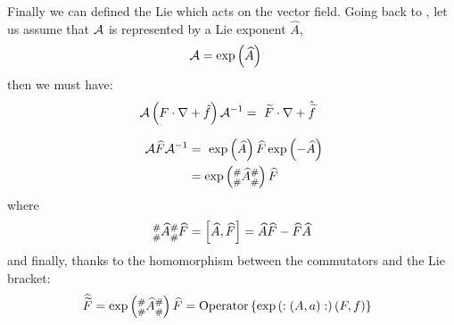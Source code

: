 \documentclass[english,12pt,article]{article} %
\begin{document}
{{{Finally we can defined the Lie which acts on the vector field. Going back to , let us assume that $\cal A$ is represented by a Lie exponent $\widehat{A}$,
%
\begin{align} {\cal A}&=\exp\left({\widehat{A}}\right) \end{align}
%
 then we must have:
%
\begin{align} \ {\cal A}\left({F\cdot \nabla +\hat{f}}\right){{\cal A}}^{-1}&=\ \widetilde{F}\cdot \nabla +\hat{\widetilde{f}} \label{aacts}\end{align}

 

%
\begin{align} \ {\cal A}\widehat{F}{{\cal A}}^{-1}&=\ \exp\left({\widehat{A}}\right)\widehat{F}\exp\left({-\widehat{A}}\right) \nonumber \\
 &=\exp\left({\dragt\widehat{A}\dragt}\right)\widehat{F}\ \label{asimillie}\end{align}
where
%
\begin{align} \mbox{\scriptsize $\begin{matrix}\# \\ \# \end{matrix}$}\widehat{A}\mbox{\scriptsize $\begin{matrix}\# \\ \# \end{matrix}$}\widehat{F}=\left[{\widehat{A},\widehat{F}}\right]=
\widehat{A}\widehat{F}-\widehat{F}\widehat{A} \end{align}
and finally, thanks to the homomorphism between the commutators and the Lie bracket:
%
\begin{align} \  \widehat{\widetilde{F}}=\exp\left({\mbox{\scriptsize $\begin{matrix}\# \\ \# \end{matrix}$}\widehat{A}\mbox{\scriptsize $\begin{matrix}\# \\ \# \end{matrix}$}}\right)\widehat{F}&=  {{\rm O}{\rm p}{\rm e}{\rm r}{\rm a}{\rm t}{\rm o}{\rm r}\left\{{\exp\left({:(A,a):}\right)(F,f)}\right\}}^{}   \label{asimillieh}\end{align}

}}}
\end{document}
